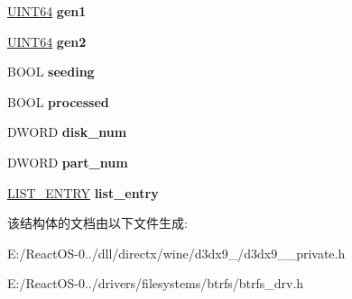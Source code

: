 \begin{DoxyCompactItemize}
\hyperlink{_processor_bind_8h_a57be03562867144161c1bfee95ca8f7c}{U\+I\+N\+T64} {\bfseries gen1}
\item 
\mbox{\label{structvolume_a5d07208de3f533e53d8dd72aa369c330}} 
\hyperlink{_processor_bind_8h_a57be03562867144161c1bfee95ca8f7c}{U\+I\+N\+T64} {\bfseries gen2}
\item 
\mbox{\label{structvolume_ae42f382571c09ea9c4f65abf55d4fc94}} 
B\+O\+OL {\bfseries seeding}
\item 
\mbox{\label{structvolume_a941593c5ab9a6984855c1fb28b79c7d3}} 
B\+O\+OL {\bfseries processed}
\item 
\mbox{\label{structvolume_a59299c7fa19d52cf04d9780416d94a10}} 
D\+W\+O\+RD {\bfseries disk\+\_\+num}
\item 
\mbox{\label{structvolume_a986cfc294f201796b86c9711aa6272b7}} 
D\+W\+O\+RD {\bfseries part\+\_\+num}
\item 
\mbox{\label{structvolume_ad292f528f4222c48b8f66dc5e5025dfe}} 
\hyperlink{struct___l_i_s_t___e_n_t_r_y}{L\+I\+S\+T\+\_\+\+E\+N\+T\+RY} {\bfseries list\+\_\+entry}
\end{DoxyCompactItemize}


该结构体的文档由以下文件生成\+:\begin{DoxyCompactItemize}
\item 
E\+:/\+React\+O\+S-\/0../dll/directx/wine/d3dx9\+\_/d3dx9\+\_\+\_\+private.\+h\item 
E\+:/\+React\+O\+S-\/0../drivers/filesystems/btrfs/btrfs\+\_\+drv.\+h\end{DoxyCompactItemize}
